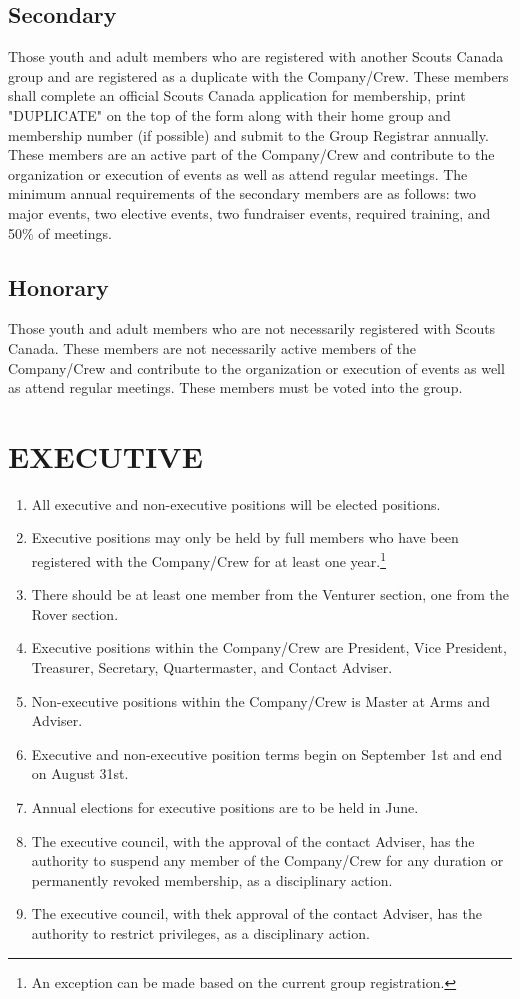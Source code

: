 \documentclass{Service_Corps_Document}
\begin{document}
\subsection{Secondary}
Those youth and adult members who are registered with another Scouts Canada group and are registered as a duplicate with the Company/Crew.
These members shall complete an official Scouts Canada application for membership, print "DUPLICATE" on the top of the form along with their home group and membership number (if possible) and submit to the Group Registrar annually.
These members are an active part of the Company/Crew and contribute to the organization or execution of events as well as attend regular meetings.
The minimum annual requirements of the secondary members are as follows: two major events, two elective events, two fundraiser events, required training, and 50\% of meetings.
\subsection{Honorary}
Those youth and adult members who are not necessarily registered with Scouts Canada.
These members are not necessarily active members of the Company/Crew and contribute to the organization or execution of events as well as attend regular meetings.
These members must be voted into the group.
\section{EXECUTIVE}
\begin{enumerate}
	\item All executive and non-executive positions will be elected positions.
	\item Executive positions may only be held by full members who have been registered with the Company/Crew for at least one year.\footnote{An exception can be made based on the current group registration.}
	\item There should be at least one member from the Venturer section, one from the Rover section. \footnotemark[\value{footnote}]
	\item Executive positions within the Company/Crew are President, Vice President, Treasurer, Secretary, Quartermaster, and Contact Adviser.
	\item Non-executive positions within the Company/Crew is Master at Arms and Adviser. 
	\item Executive and non-executive position terms begin on September 1st and end on August 31st.
	\item Annual elections for executive positions are to be held in June.
	\item The executive council, with the approval of the contact Adviser, has the authority to suspend any member of the Company/Crew for any duration or permanently revoked membership, as a disciplinary action.
	\item The executive council, with thek approval of the contact Adviser, has the authority to restrict privileges, as a disciplinary action.
\end{enumerate}
\end{document}
